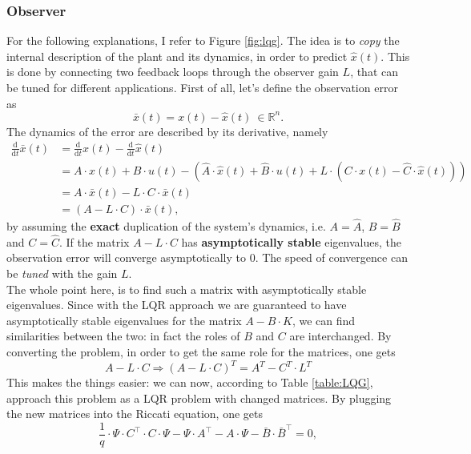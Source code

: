 \documentclass[a4paper,12 pt]{article}
\numberwithin{equation}{section}
\theoremstyle{definition}
\theoremstyle{remark}
\theoremstyle{definition}
\theoremstyle{definition}
\theoremstyle{definition}
\theoremstyle{remark}
\begin{document}
\subsubsection{Observer}
For the following explanations, I refer to Figure \ref{fig:lqg}. The idea is to \textit{copy} the internal description of the plant and its dynamics, in order to predict $\hat{x}(t)$. This is done by connecting two feedback loops through the observer gain $L$, that can be tuned for different applications. First of all, let's define the observation error as
\begin{equation}
\bar{x}(t)=x(t)-\hat{x}(t) \ \in \mathbb{R}^n.
\end{equation}
The dynamics of the error are described by its derivative, namely
\begin{equation}
\begin{split}
\frac{\text{d}}{\text{d}t}\bar{x}(t)&=\frac{\text{d}}{\text{d}t}x(t)-\frac{\text{d}}{\text{d}t}\hat x(t) \\
&=A\cdot x(t)+B\cdot u(t)-(\hat A\cdot\hat x(t)+\hat B\cdot u(t)+L\cdot (C\cdot x(t)-\hat C\cdot\hat x(t))) \\
&=A\cdot \bar x(t)-L\cdot C\cdot \bar x(t) \\
&=(A-L\cdot C)\cdot \bar x(t),
\end{split}
\end{equation}
by assuming the \textbf{exact} duplication of the system's dynamics, i.e. $A=\hat{A}$, $B=\hat{B}$ and $C=\hat{C}$. If the matrix $A-L\cdot C$ has \textbf{asymptotically stable} eigenvalues, the observation error will converge asymptotically to 0. The speed of convergence can be \textit{tuned} with the gain $L$. \\
The whole point here, is to find such a matrix with asymptotically stable eigenvalues. Since with the LQR approach we are guaranteed to have asymptotically stable eigenvalues for the matrix $A-B\cdot K$, we can find similarities between the two: in fact the roles of $B$ and $C$ are interchanged. By converting the problem, in order to get the same role for the matrices, one gets
\begin{equation}
A-L\cdot C \Rightarrow (A-L\cdot C)^T=A^T-C^T\cdot L^T
\end{equation}
This makes the things easier: we can now, according to Table \ref{table:LQG}, approach this problem as a LQR problem with changed matrices.
By plugging the new matrices into the Riccati equation, one gets
\begin{equation}
\frac{1}{q}\cdot \Psi\cdot C^\intercal\cdot C\cdot \Psi-\Psi\cdot A^\intercal-A\cdot\Psi-\bar B\cdot \bar B^\intercal=0,
\end{equation}
\end{document}
